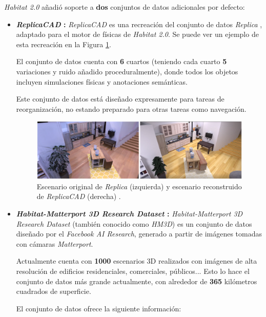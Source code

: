 \textit{Habitat 2.0} añadió soporte a \textbf{dos} conjuntos de datos adicionales por defecto:
\begin{itemize}
	\item \textbf{\textit{ReplicaCAD} \cite{szot2021habitat}:} \textit{ReplicaCAD} es una recreación del conjunto de datos \textit{Replica} \cite{DBLP:journals/corr/abs-1906-05797}, adaptado para el motor de físicas de \textit{Habitat 2.0}. Se puede ver un ejemplo de esta recreación en la Figura \ref{fig:chap4-replicaCAD}.
	
	El conjunto de datos cuenta con \textbf{6} cuartos (teniendo cada cuarto \textbf{5} variaciones y ruido añadido proceduralmente), donde todos los objetos incluyen simulaciones físicas y anotaciones semánticas.
	
	Este conjunto de datos está diseñado expresamente para tareas de reorganización, no estando preparado para otras tareas como navegación.
	
\begin{figure}[h]
    \centering
    \includegraphics[width=\textwidth]{imagenes/cap4/replicaCAD.png}
    \caption{Escenario original de \textit{Replica} (izquierda) y escenario reconstruido de \textit{ReplicaCAD} (derecha) \cite{szot2021habitat}.}
    \label{fig:chap4-replicaCAD}
\end{figure}	
	
	\item \textbf{\textit{Habitat-Matterport 3D Research Dataset} \cite{habitatmp3d}:} \textit{Habitat-Matterport 3D Research Dataset} (también conocido como \textit{HM3D}) es un conjunto de datos diseñado por el \textit{Facebook AI Research}, generado a partir de imágenes tomadas con cámaras \textit{Matterport}.
	
	Actualmente cuenta con \textbf{1000} escenarios 3D realizados con imágenes de alta resolución de edificios residenciales, comerciales, públicos... Esto lo hace el conjunto de datos más grande actualmente, con alrededor de \textbf{365} kilómetros cuadrados de superficie.
	
	El conjunto de datos ofrece la siguiente información:
	

\end{itemize}
